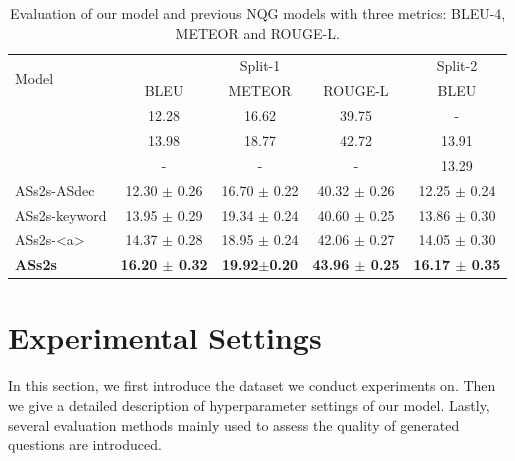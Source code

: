 \documentclass[letterpaper]{article} %
\newcommand\Tstrut{\rule{0pt}{2.3ex}}         %
\begin{document}
\begin{table}[!htb]
\centering
\begin{tabular}{|l|ccc|c|}
\hline
\multirow{2}{*}{Model} & \multicolumn{3}{c|}{Split-1} & Split-2\Tstrut  \\ \cline{2-5}
& BLEU & METEOR & ROUGE-L & BLEU\Tstrut \\  \hline
\cite{du2017learning} & 12.28 & 16.62 & 39.75 & - \Tstrut  \\
\cite{song2018leveraging} & 13.98 & 18.77 & 42.72 & 13.91  \\
\cite{zhou2017neural} & - & - & - & 13.29  \\ \hline
ASs2s-ASdec & 12.30 $\pm$ 0.26 & 16.70 $\pm$ 0.22 & 40.32 $\pm$ 0.26 & 12.25 $\pm$ 0.24 \Tstrut \\
ASs2s-keyword & 13.95 $\pm$ 0.29 & 19.34 $\pm$ 0.24 & 40.60 $\pm$ 0.25& 13.86 $\pm$ 0.30 \Tstrut \\
ASs2s-\textless a\textgreater{} & 14.37 $\pm$ 0.28 & 18.95 $\pm$ 0.24 & 42.06 $\pm$ 0.27 & 14.05 $\pm$ 0.30\Tstrut  \\
\textbf{ASs2s} & \textbf{16.20 $\pm$ 0.32} & \textbf{19.92$\pm$0.20} & \textbf{43.96 $\pm$ 0.25} & \textbf{16.17 $\pm$ 0.35}\Tstrut  \\
\hline
\end{tabular}%
\caption{Evaluation of our model and previous NQG models with three metrics: BLEU-4, METEOR and ROUGE-L.}
\label{table:evaluation}
\end{table}


\section{Experimental Settings}
In this section, we first introduce the dataset we conduct experiments on. Then we give a detailed description of hyperparameter settings of our model. Lastly, several evaluation methods mainly used to assess the quality of generated questions are introduced.
\end{document}
